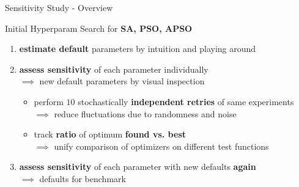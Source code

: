 \documentclass[11pt,aspectratio=169]{beamer}
\begin{document}
\begin{frame}[fragile]{Sensitivity Study - Overview}

    Initial Hyperparam Search for \textbf{SA, PSO, APSO}
    \begin{enumerate}
        \item \textbf{estimate default} parameters by intuition and playing around
        \item \textbf{assess sensitivity} of each parameter individually\\
            $\implies$ new default parameters by visual inspection
            \begin{itemize}
                \item perform $10$ stochastically \textbf{independent retries} of same experiments\\
                    $\implies$ reduce fluctuations due to randomness and noise
                \item track \textbf{ratio} of optimum \textbf{found vs. best}\\
                    $\implies$ unify comparison of optimizers on different test functions
            \end{itemize}
        \item \textbf{assess sensitivity} of each parameter with new defaults \textbf{again}\\
            $\implies$ defaults for benchmark
    \end{enumerate}
\end{frame}

%
%
\end{document}
